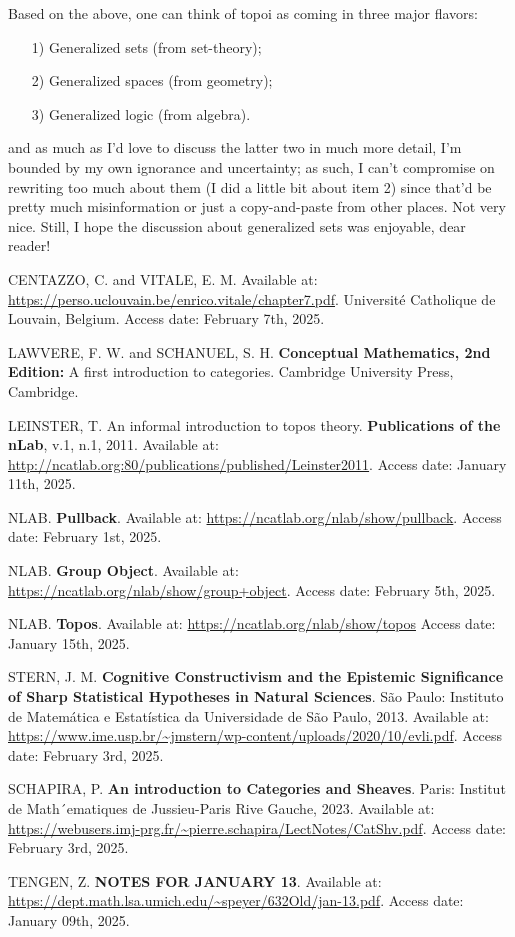 \documentclass{article}
\begin{document}
Based on the above, one can think of topoi as coming in three major flavors:
\begin{itemize}
	\item[1)] Generalized sets (from set-theory);
	\item[2)] Generalized spaces (from geometry);
	\item[3)] Generalized logic (from algebra).
\end{itemize}
and as much as I'd love to discuss the latter two in much more detail, I'm bounded by my own ignorance and uncertainty; as such, I can't compromise on rewriting too much about them (I did a little bit about item 2) since that'd be pretty much misinformation or just a copy-and-paste from other places. Not very nice. Still, I hope the discussion about generalized sets was enjoyable, dear reader!

\begin{thebibliography}{99}
	 CENTAZZO, C. and VITALE, E. M. Available at: \url{https://perso.uclouvain.be/enrico.vitale/chapter7.pdf}. Université Catholique de Louvain, Belgium. Access date: February 7th, 2025.

	LAWVERE, F. W. and SCHANUEL, S. H. \textbf{Conceptual Mathematics, 2nd Edition:} A first introduction to categories. Cambridge University Press, Cambridge.

	LEINSTER, T. An informal introduction to topos theory. \textbf{Publications of the nLab}, v.1, n.1, 2011. Available at: \url{http://ncatlab.org:80/publications/published/Leinster2011}. Access date: January 11th, 2025.

	NLAB. \textbf{Pullback}. Available at: \url{https://ncatlab.org/nlab/show/pullback}. Access date: February 1st, 2025.

	NLAB. \textbf{Group Object}. Available at: \url{https://ncatlab.org/nlab/show/group+object}. Access date: February 5th, 2025.

	NLAB. \textbf{Topos}. Available at: \url{https://ncatlab.org/nlab/show/topos} Access date: January 15th, 2025.

	STERN, J. M. \textbf{Cognitive Constructivism and the Epistemic Significance of Sharp Statistical Hypotheses in Natural Sciences}. São Paulo: Instituto de Matemática e Estatística da Universidade de São Paulo, 2013. Available at: \url{https://www.ime.usp.br/~jmstern/wp-content/uploads/2020/10/evli.pdf}. Access date: February 3rd, 2025.

	SCHAPIRA, P. \textbf{An introduction to Categories and Sheaves}. Paris: Institut de Math´ematiques de Jussieu-Paris Rive Gauche, 2023. Available at: \url{https://webusers.imj-prg.fr/~pierre.schapira/LectNotes/CatShv.pdf}. Access date: February 3rd, 2025.

	TENGEN, Z. \textbf{NOTES FOR JANUARY 13}. Available at: \url{https://dept.math.lsa.umich.edu/~speyer/632Old/jan-13.pdf}. Access date: January 09th, 2025.

\end{thebibliography}
\end{document}
